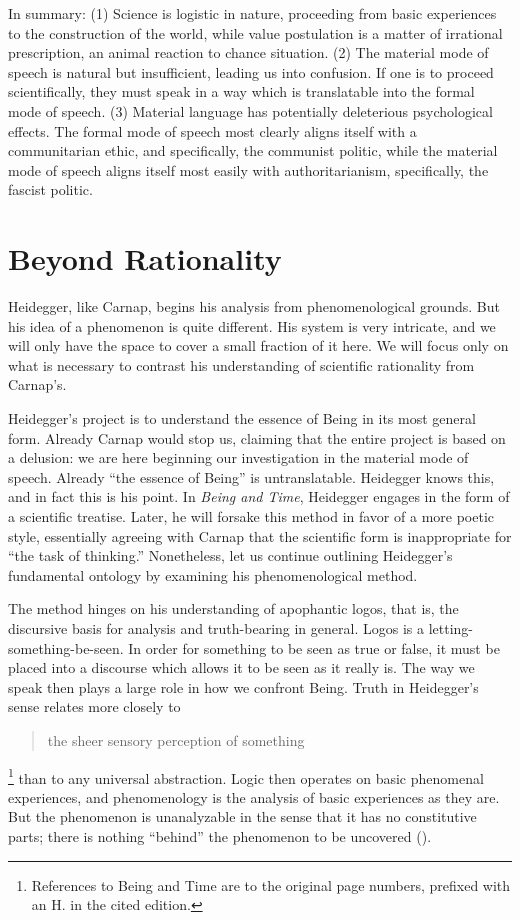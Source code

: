 \documentclass[leqno, 12pt]{turabian-researchpaper}
\begin{document}
	In summary: (1) Science is logistic in nature, proceeding from basic experiences
	to the construction of the world, while value postulation is a matter of
	irrational prescription, an animal reaction to chance situation. (2) The
	material mode of speech is natural but insufficient, leading us into confusion.
	If one is to proceed scientifically, they must speak in a way which is translatable
	into the formal mode of speech. (3) Material language has potentially
	deleterious psychological effects. The formal mode of speech most clearly aligns
	itself with a communitarian ethic, and specifically, the communist politic,
	while the material mode of speech aligns itself most easily with
	authoritarianism, specifically, the fascist politic.

	\section{Beyond Rationality}

	Heidegger, like Carnap, begins his analysis from phenomenological grounds. But
	his idea of a phenomenon is quite different. His system is very intricate, and
	we will only have the space to cover a small fraction of it here. We will focus
	only on what is necessary to contrast his understanding of scientific rationality
	from Carnap's.

	Heidegger's project is to understand the essence of Being in its most general form.
	Already Carnap would stop us, claiming that the entire project is based on a delusion:
	we are here beginning our investigation in the material mode of speech. Already
	\enquote{the essence of Being} is untranslatable. Heidegger knows this, and in
	fact this is his point. In \textit{Being and Time}, Heidegger engages in the form
	of a scientific treatise. Later, he will forsake this method in favor of a more
	poetic style, essentially agreeing with Carnap that the scientific form is
	inappropriate for \enquote{the task of thinking.} Nonetheless, let us continue
	outlining Heidegger's fundamental ontology by examining his phenomenological
	method.

	The method hinges on his understanding of apophantic logos, that is, the
	discursive basis for analysis and truth-bearing in general. Logos is a letting-something-be-seen.
	In order for something to be seen as true or false, it must be placed into a discourse
	which allows it to be seen as it really is. The way we speak then plays a
	large role in how we confront Being. Truth in Heidegger's sense relates more closely
	to \blockquote[{}]{the sheer sensory perception of something}\footnote{References
	to Being and Time are to the original page numbers, prefixed with an H. in the
	cited edition.} than to any universal abstraction. Logic then operates on basic
	phenomenal experiences, and phenomenology is the analysis of basic experiences
	as they are. But the phenomenon is unanalyzable in the sense that it has no constitutive
	parts; there is nothing \enquote{behind} the phenomenon to be uncovered ().
\end{document}
